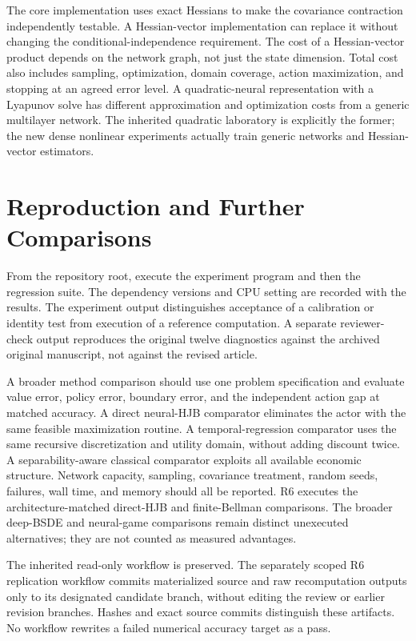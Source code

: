 \documentclass[ecta,draft]{econsocart}
\begin{document}
The core implementation uses exact Hessians to make the covariance contraction independently testable. A Hessian-vector implementation can replace it without changing the conditional-independence requirement. The cost of a Hessian-vector product depends on the network graph, not just the state dimension. Total cost also includes sampling, optimization, domain coverage, action maximization, and stopping at an agreed error level. A quadratic-neural representation with a Lyapunov solve has different approximation and optimization costs from a generic multilayer network. The inherited quadratic laboratory is explicitly the former; the new dense nonlinear experiments actually train generic networks and Hessian-vector estimators.

\section{Reproduction and Further Comparisons}
From the repository root, execute the experiment program and then the regression suite. The dependency versions and CPU setting are recorded with the results. The experiment output distinguishes acceptance of a calibration or identity test from execution of a reference computation. A separate reviewer-check output reproduces the original twelve diagnostics against the archived original manuscript, not against the revised article.

A broader method comparison should use one problem specification and evaluate value error, policy error, boundary error, and the independent action gap at matched accuracy. A direct neural-HJB comparator eliminates the actor with the same feasible maximization routine. A temporal-regression comparator uses the same recursive discretization and utility domain, without adding discount twice. A separability-aware classical comparator exploits all available economic structure. Network capacity, sampling, covariance treatment, random seeds, failures, wall time, and memory should all be reported. R6 executes the architecture-matched direct-HJB and finite-Bellman comparisons. The broader deep-BSDE and neural-game comparisons remain distinct unexecuted alternatives; they are not counted as measured advantages.

The inherited read-only workflow is preserved. The separately scoped R6 replication workflow commits materialized source and raw recomputation outputs only to its designated candidate branch, without editing the review or earlier revision branches. Hashes and exact source commits distinguish these artifacts. No workflow rewrites a failed numerical accuracy target as a pass.


\end{document}

